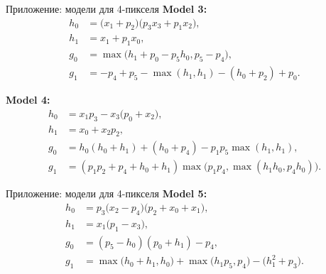 \documentclass{beamer}
\begin{document}
\begin{frame}{Приложение: модели для 4-пикселя}
    \textbf{Model 3:}
    \begin{align*}
    h_0 &= \bigl(x_1 + p_2\bigr)\bigl(p_3x_3 + p_1x_2\bigr),\\
    h_1 &= x_1 + p_1x_0,\\
    g_0 &= \max\bigl(h_1 + p_0 - p_5h_0, p_5 - p_4\bigr),\\
    g_1 &= -p_4 + p_5 - \max(h_1,h_1) - (h_0 + p_2) + p_0.
    \end{align*}
    
    \textbf{Model 4:}
    \begin{align*}
    h_0 &= x_1p_3 - x_3\bigl(p_0 + x_2\bigr),\\
    h_1 &= x_0 + x_2p_2,\\
    g_0 &= h_0(h_0 + h_1) + (h_0 + p_4) - p_1p_5\max(h_1,h_1),\\
    g_1 &= (p_1p_2 + p_4 + h_0 + h_1)\max\bigl(p_1p_4, \max(h_1h_0,p_4h_0)\bigr).
    \end{align*}
\end{frame}
\begin{frame}{Приложение: модели для 4-пикселя}
    \textbf{Model 5:}
    \begin{align*}
    h_0 &= p_3\bigl(x_2 - p_4\bigr)\bigl(p_2 + x_0 + x_1\bigr),\\
    h_1 &= x_1\bigl(p_1 - x_3\bigr),\\
    g_0 &= (p_5 - h_0)(p_0 + h_1) - p_4,\\
    g_1 &= \max\bigl(h_0 + h_1,h_0\bigr) + \max\bigl(h_1p_5,p_4\bigr) - \bigl(h_1^2 + p_3\bigr).
    \end{align*}
\end{frame}
\end{document}
